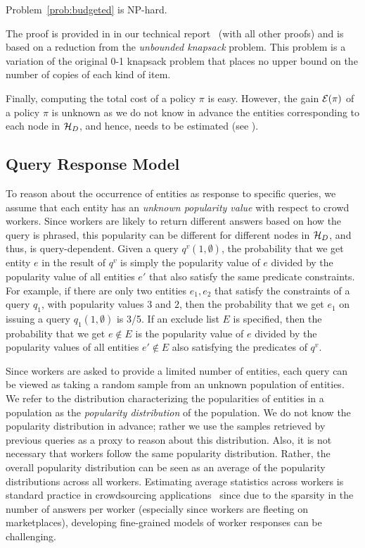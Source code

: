 \begin{theorem}
Problem~\ref{prob:budgeted} is NP-hard.
\end{theorem}
The proof is provided 
\iftr in 
\fi
\ifpaper in our technical report~\cite{cruxsup} (with all other proofs)
\fi 
and is based on a reduction from the {\em unbounded knapsack} problem. This problem is a variation of the original 0-1 knapsack problem that places no upper bound on the number of copies of each kind of item. 

Finally, computing the total cost of a policy $\pi$ is easy. However, the gain $\mathcal{E}(\pi)$ of a policy $\pi$ is unknown as we do not know in advance the entities corresponding to each node in $\mathcal{H}_D$, and hence, needs to be estimated (see ). 

\subsection{Query Response Model}
\label{sec:sampling}
To reason about the occurrence of entities as response to specific queries, we assume that each entity has an {\em unknown popularity value} with respect to crowd workers. Since workers are likely to return different answers based on how the query is phrased, this popularity can be different for different nodes in $\mathcal{H}_D$, and thus, is query-dependent. 
Given a query $q^v(1, \emptyset)$, the probability that we get entity $e$ in the result of $q^v$ is simply the popularity value of $e$ divided by the popularity value of all entities $e'$ that also satisfy the same predicate constraints. For example, if there are only two entities $e_1, e_2$ that satisfy the constraints of a query $q_1$, with popularity values $3$ and $2$, then the probability that we get $e_1$ on issuing a query $q_1(1, \emptyset)$ is 3/5. If an exclude list $E$ is specified, then the probability that we get $e \notin E$ is the popularity value of $e$ divided by the popularity values of all entities $e' \notin E$ also satisfying the predicates of $q^v$. 

Since workers are asked to provide a limited number of entities, each query can be viewed as taking a random sample from an unknown population of entities. We refer to the distribution characterizing the popularities of entities in a population as the {\em popularity distribution} of the population. We do not know the popularity distribution in advance; rather we use the samples retrieved by previous queries as a proxy to reason about this distribution. Also, it is not necessary that workers follow the same popularity distribution. Rather, the overall popularity distribution can be seen as an average of the popularity distributions across all workers. 
\iftr
Estimating average statistics across workers is standard practice in crowdsourcing applications~\cite{DasSarma:2016:TGO:2882903.2882953,trushkowsky:2013} since due to the sparsity in the number of answers per worker (especially since workers are fleeting on marketplaces), developing fine-grained models of worker responses can be challenging.
\fi


